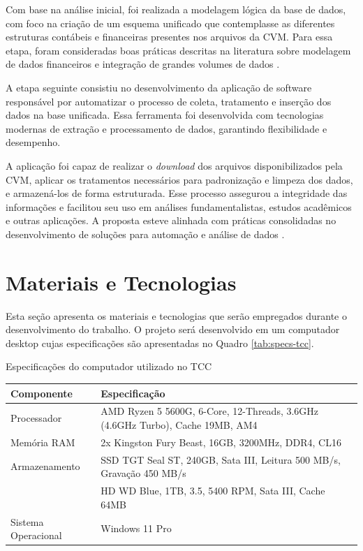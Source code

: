 \documentclass[recuosum=1.5cm]{iftex2024}
\begin{document}
Com base na análise inicial, foi realizada a modelagem lógica da base de dados, com foco na criação de um esquema unificado que contemplasse as diferentes estruturas contábeis e financeiras presentes nos arquivos da CVM. Para essa etapa, foram consideradas boas práticas descritas na literatura sobre modelagem de dados financeiros \cite{domingues:2020:modelagem} e integração de grandes volumes de dados \cite{perlin:2021:analise}.

A etapa seguinte consistiu no desenvolvimento da aplicação de software responsável por automatizar o processo de coleta, tratamento e inserção dos dados na base unificada. Essa ferramenta foi desenvolvida com tecnologias modernas de extração e processamento de dados, garantindo flexibilidade e desempenho.

A aplicação foi capaz de realizar o \textit{download} dos arquivos disponibilizados pela CVM, aplicar os tratamentos necessários para padronização e limpeza dos dados, e armazená-los de forma estruturada. Esse processo assegurou a integridade das informações e facilitou seu uso em análises fundamentalistas, estudos acadêmicos e outras aplicações. A proposta esteve alinhada com práticas consolidadas no desenvolvimento de soluções para automação e análise de dados \cite{prikladnicki:2014:desenvolvimentosoftware} \cite{nhimi:2016:desenvolvimentosoftware}.


\section{Materiais e Tecnologias} \label{subsec:material}

Esta seção apresenta os materiais e tecnologias que serão empregados durante o desenvolvimento do trabalho.  
O projeto será desenvolvido em um computador desktop cujas especificações são apresentadas no Quadro \ref{tab:specs-tcc}.  


\begin{board}[!htb]  \centering
	\caption{Especificações do computador utilizado no TCC}
	\label{tab:specs-tcc}
	\begin{varwidth}{\linewidth}
		\begin{tabular}{|p{4cm}|p{11cm}|} \hline
			\textbf{Componente} & \textbf{Especificação} \\ \hline
			Processador & AMD Ryzen 5 5600G, 6-Core, 12-Threads, 3.6GHz (4.6GHz Turbo), Cache 19MB, AM4 \\ \hline  
			Memória RAM & 2x Kingston Fury Beast, 16GB, 3200MHz, DDR4, CL16 \\ \hline  
			Armazenamento & SSD TGT Seal ST, 240GB, Sata III, Leitura 500 MB/s, Gravação 450 MB/s \\  
			& HD WD Blue, 1TB, 3.5, 5400 RPM, Sata III, Cache 64MB \\ \hline  
			Sistema Operacional & Windows 11 Pro \\ \hline
		\end{tabular}
	\end{varwidth}
\end{board}
\end{document}

